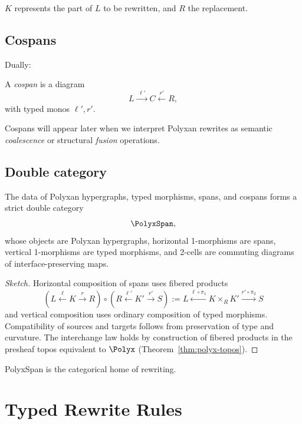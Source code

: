 $K$ represents the part of $L$ to be rewritten, and $R$ the replacement.

\subsection{Cospans}

Dually:

\begin{definition}[Cospan]
A \emph{cospan} is a diagram
\[
L \xrightarrow{\;\ell'\;} C \xleftarrow{\;r'\;} R,
\]
with typed monos $\ell',r'$.
\end{definition}

Cospans will appear later when we interpret Polyxan rewrites as semantic
\emph{coalescence} or structural \emph{fusion} operations.

\subsection{Double category}

\begin{theorem}
The data of Polyxan hypergraphs, typed morphisms, spans, and cospans forms a
strict double category
\[
\PolyxSpan,
\]
whose objects are Polyxan hypergraphs, horizontal 1-morphisms are spans,
vertical 1-morphisms are typed morphisms, and 2-cells are commuting diagrams
of interface-preserving maps.
\end{theorem}

\begin{proof}[Sketch]
Horizontal composition of spans uses fibered products
\[
(L \xleftarrow{\ell} K \xrightarrow{r} R)
\circ
(R \xleftarrow{\ell'} K' \xrightarrow{r'} S)
:=
L \xleftarrow{\ell\circ\pi_1} K \times_R K' \xrightarrow{r'\circ \pi_2} S
\]
and vertical composition uses ordinary composition of typed morphisms.
Compatibility of sources and targets follows from preservation of type and
curvature.  The interchange law holds by construction of fibered products in
the presheaf topos equivalent to $\Polyx$ (Theorem~\ref{thm:polyx-topos}).
\end{proof}

PolyxSpan is the categorical home of rewriting.

\section{Typed Rewrite Rules}

